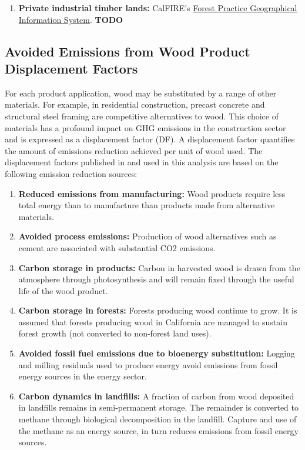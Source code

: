 \documentclass[a4paper]{article}
\begin{document}
\begin{enumerate}
\begin{enumerate}
\item \textbf{Private industrial timber lands:} CalFIRE's
\href{http://www.calfire.ca.gov/resource_mgt/resource_mgt_forestpractice_gis}{Forest
Practice Geographical Information System}. \textbf{TODO}
\end{enumerate}
\end{enumerate}

\subsection{Avoided Emissions from Wood Product Displacement Factors}
\label{sec-3-4}

For each product application, wood may be substituted by a range of other materials. For example, in
residential construction, precast concrete and structural steel framing
are competitive alternatives to wood. This choice of materials has a profound impact on GHG emissions in the
construction sector and is expressed as a displacement
factor (DF). A displacement factor quantifies the amount of emissions
reduction achieved per unit of wood used. The displacement factors published in
\citep{Sathre2010} and used in this analysis are based on the
following emission reduction sources:

\begin{enumerate}
\item \textbf{Reduced emissions from manufacturing:} Wood products require less total
energy than to manufacture than products made from alternative materials.
\item \textbf{Avoided process emissions:} Production of wood alternatives such as cement are associated with 
substantial CO2 emissions.
\item \textbf{Carbon storage in products:} Carbon in harvested wood is drawn from
the atmosphere through photosynthesis and will remain fixed through
the useful life of the wood product.
\item \textbf{Carbon storage in forests:} Forests producing wood continue to grow.
It is assumed that forests producing wood in California are managed
to sustain forest growth (not converted to non-forest land uses).
\item \textbf{Avoided fossil fuel emissions due to bioenergy substitution:}
Logging and milling residuals used to produce energy avoid emissions
from fossil energy sources in the energy sector.
\item \textbf{Carbon dynamics in landfills:} A fraction of carbon from wood
deposited in landfills remains in semi-permanent storage.
The remainder is converted to methane through biological
decomposition in the landfill. Capture and use of the methane as an
energy source, in turn reduces emissions from fossil energy sources.
\end{enumerate}
\end{document}
